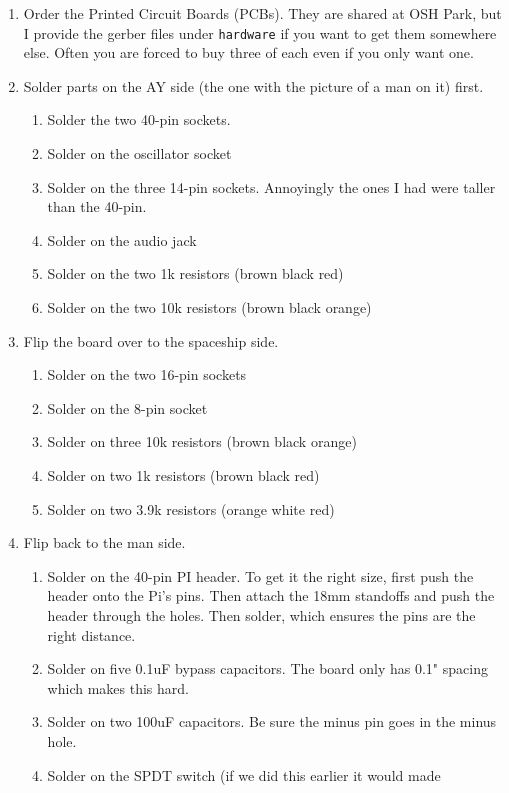 \documentclass[11pt]{article}
\begin{document}
\begin{enumerate}
\item	Order the Printed Circuit Boards (PCBs).
	They are shared at OSH Park, but I provide the gerber files under
	{\tt hardware} if you want to get them somewhere else.
	Often you are forced to buy three of each even if you only want one.
\item	Solder parts on the AY side (the one with the picture of a man on it) first.
	\begin{enumerate}
		\item Solder the two 40-pin sockets.
		\item Solder on the oscillator socket
		\item Solder on the three 14-pin sockets.
			Annoyingly the ones I had were taller than the 40-pin.
		\item Solder on the audio jack
		\item Solder on the two 1k resistors (brown black red)
		\item Solder on the two 10k resistors (brown black orange)
	\end{enumerate}
\item	Flip the board over to the spaceship side.
	\begin{enumerate}
		\item Solder on the two 16-pin sockets
		\item Solder on the 8-pin socket
		\item Solder on three 10k resistors (brown black orange)
		\item Solder on two 1k resistors (brown black red)
		\item Solder on two 3.9k resistors (orange white red)
	\end{enumerate}
\item	Flip back to the man side.
	\begin{enumerate}
		\item Solder on the 40-pin PI header.
			To get it the right size, first push the header onto the Pi's pins.
			Then attach the 18mm standoffs and push the header through the holes.
			Then solder, which ensures the pins are the right distance.
		\item Solder on five 0.1uF bypass capacitors.
			The board only has 0.1" spacing which makes this hard.
		\item Solder on two 100uF capacitors.
			 Be sure the minus pin goes in the minus hole.
		\item	Solder on the SPDT switch
			(if we did this earlier it would made

\end{enumerate}
\end{enumerate}
\end{document}
